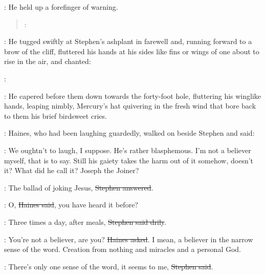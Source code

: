 :
He held up a forefinger of warning.

\begin{verse}
\Mulligan:
\end{verse}

:
He tugged swiftly at Stephen's ashplant in farewell
and, running forward to a brow of the cliff,
fluttered his hands at his sides
like fins or wings of one about to rise in the air,
and chanted:

\Mulligan:
\begin{verse}
\end{verse}

:
He capered before them down towards the forty-foot hole,
fluttering his winglike hands,
leaping nimbly,
Mercury's hat quivering in the fresh wind
that bore back to them his brief birdsweet cries.


:
Haines,
who had been laughing guardedly,
walked on beside Stephen
and said:

\Haines:
We oughtn't to laugh,
I suppose.
He's rather blasphemous.
I'm not a believer myself, that is to say.
Still his gaiety takes the harm out of it somehow, doesn't it?
What did he call it?
Joseph the Joiner?

\Stephen:
The ballad of joking Jesus,
\sout{Stephen answered}.

\Haines:
O,
\sout{Haines said},
you have heard it before?

\Stephen:
Three times a day, after meals,
\sout{Stephen said drily}.

\Haines:
You're not a believer, are you?
\sout{Haines asked}.
I mean, a believer in the narrow sense of the word.
Creation from nothing and miracles and a personal God.

\Stephen:
There's only one sense of the word,
it seems to me,
\sout{Stephen said}.

